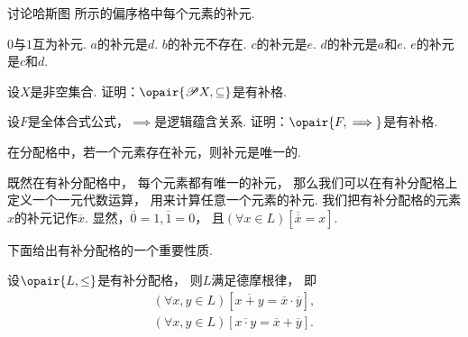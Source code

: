 \begin{example}
讨论哈斯图  所示的偏序格中每个元素的补元.
\begin{figure}[hbt]
	\centering
	\caption{}
	\label{figure:格论.偏序集4}
\end{figure}
\begin{solution}
\(0\)与\(1\)互为补元.
\(a\)的补元是\(d\).
\(b\)的补元不存在.
\(c\)的补元是\(e\).
\(d\)的补元是\(a\)和\(e\).
\(e\)的补元是\(c\)和\(d\).
\end{solution}
\end{example}

\begin{example}
设\(X\)是非空集合.
证明：\(\opair{\Powerset X,\subseteq}\)是有补格.
\end{example}

\begin{example}
设\(F\)是全体合式公式，\(\implies\)是逻辑蕴含关系.
证明：\(\opair{F,\implies}\)是有补格.
\end{example}

\begin{theorem}
在分配格中，若一个元素存在补元，则补元是唯一的.
\end{theorem}

既然在有补分配格中，
每个元素都有唯一的补元，
那么我们可以在有补分配格上定义一个一元代数运算，
用来计算任意一个元素的补元.
我们把有补分配格的元素\(x\)的补元记作\(\overline{x}\).
显然，\(\overline{0} = 1,
\overline{1} = 0\)，
且\((\forall x \in L)
\left[\overline{\overline{x}} = x\right]\).

下面给出有补分配格的一个重要性质.
\begin{theorem}
设\(\opair{L,\leq}\)是有补分配格，
则\(L\)满足德摩根律，
即\begin{gather*}
	(\forall x,y \in L)
	\left[\overline{x + y} = \overline{x} \cdot \overline{y}\right], \\
	(\forall x,y \in L)
	\left[\overline{x \cdot y} = \overline{x} + \overline{y}\right].
\end{gather*}
\end{theorem}
